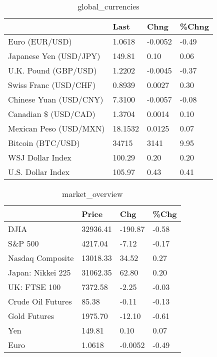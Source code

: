 \documentclass{article}%
\begin{document}
%


\begin{table}[htbp]%
\caption{global\_currencies}%
\centering%
\begin{adjustbox}{width=1\textwidth}%
\begin{tabular}{llll}
\toprule
                       &    Last &    Chng & \%Chng \\
\midrule
        Euro (EUR/USD) &  1.0618 & -0.0052 & -0.49 \\
Japanese Yen (USD/JPY) &  149.81 &    0.10 &  0.06 \\
  U.K. Pound (GBP/USD) &  1.2202 & -0.0045 & -0.37 \\
 Swiss Franc (USD/CHF) &  0.8939 &  0.0027 &  0.30 \\
Chinese Yuan (USD/CNY) &  7.3100 & -0.0057 & -0.08 \\
  Canadian \$ (USD/CAD) &  1.3704 &  0.0014 &  0.10 \\
Mexican Peso (USD/MXN) & 18.1532 &  0.0125 &  0.07 \\
     Bitcoin (BTC/USD) &   34715 &    3141 &  9.95 \\
      WSJ Dollar Index &  100.29 &    0.20 &  0.20 \\
     U.S. Dollar Index &  105.97 &    0.43 &  0.41 \\
\bottomrule
\end{tabular}
%
\end{adjustbox}%
\end{table}

%


\begin{table}[htbp]%
\caption{market\_overview}%
\centering%
\begin{adjustbox}{width=1\textwidth}%
\begin{tabular}{llll}
\toprule
                  &    Price &     Chg &  \%Chg \\
\midrule
             DJIA & 32936.41 & -190.87 & -0.58 \\
          S\&P 500 &  4217.04 &   -7.12 & -0.17 \\
 Nasdaq Composite & 13018.33 &   34.52 &  0.27 \\
Japan: Nikkei 225 & 31062.35 &   62.80 &  0.20 \\
     UK: FTSE 100 &  7372.58 &   -2.25 & -0.03 \\
Crude Oil Futures &    85.38 &   -0.11 & -0.13 \\
     Gold Futures &  1975.70 &  -12.10 & -0.61 \\
              Yen &   149.81 &    0.10 &  0.07 \\
             Euro &   1.0618 & -0.0052 & -0.49 \\
\bottomrule
\end{tabular}
%
\end{adjustbox}%
\end{table}

%
\end{document}
